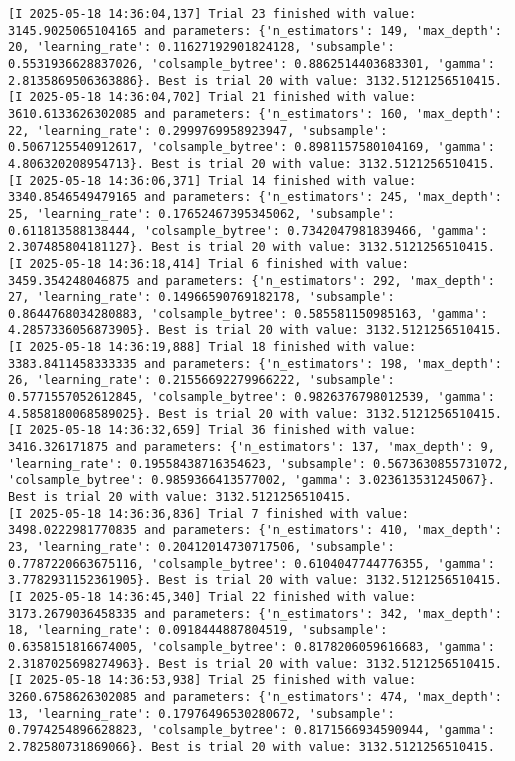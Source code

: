 \documentclass[
  letterpaper,
  DIV=11,
  numbers=noendperiod]{scrreprt}
\begin{document}
\begin{verbatim}
[I 2025-05-18 14:36:04,137] Trial 23 finished with value: 3145.9025065104165 and parameters: {'n_estimators': 149, 'max_depth': 20, 'learning_rate': 0.11627192901824128, 'subsample': 0.5531936628837026, 'colsample_bytree': 0.8862514403683301, 'gamma': 2.8135869506363886}. Best is trial 20 with value: 3132.5121256510415.
[I 2025-05-18 14:36:04,702] Trial 21 finished with value: 3610.6133626302085 and parameters: {'n_estimators': 160, 'max_depth': 22, 'learning_rate': 0.2999769958923947, 'subsample': 0.5067125540912617, 'colsample_bytree': 0.8981157580104169, 'gamma': 4.806320208954713}. Best is trial 20 with value: 3132.5121256510415.
[I 2025-05-18 14:36:06,371] Trial 14 finished with value: 3340.8546549479165 and parameters: {'n_estimators': 245, 'max_depth': 25, 'learning_rate': 0.17652467395345062, 'subsample': 0.611813588138444, 'colsample_bytree': 0.7342047981839466, 'gamma': 2.307485804181127}. Best is trial 20 with value: 3132.5121256510415.
[I 2025-05-18 14:36:18,414] Trial 6 finished with value: 3459.354248046875 and parameters: {'n_estimators': 292, 'max_depth': 27, 'learning_rate': 0.14966590769182178, 'subsample': 0.8644768034280883, 'colsample_bytree': 0.585581150985163, 'gamma': 4.2857336056873905}. Best is trial 20 with value: 3132.5121256510415.
[I 2025-05-18 14:36:19,888] Trial 18 finished with value: 3383.8411458333335 and parameters: {'n_estimators': 198, 'max_depth': 26, 'learning_rate': 0.21556692279966222, 'subsample': 0.5771557052612845, 'colsample_bytree': 0.9826376798012539, 'gamma': 4.5858180068589025}. Best is trial 20 with value: 3132.5121256510415.
[I 2025-05-18 14:36:32,659] Trial 36 finished with value: 3416.326171875 and parameters: {'n_estimators': 137, 'max_depth': 9, 'learning_rate': 0.19558438716354623, 'subsample': 0.5673630855731072, 'colsample_bytree': 0.9859366413577002, 'gamma': 3.023613531245067}. Best is trial 20 with value: 3132.5121256510415.
[I 2025-05-18 14:36:36,836] Trial 7 finished with value: 3498.0222981770835 and parameters: {'n_estimators': 410, 'max_depth': 23, 'learning_rate': 0.20412014730717506, 'subsample': 0.7787220663675116, 'colsample_bytree': 0.6104047744776355, 'gamma': 3.7782931152361905}. Best is trial 20 with value: 3132.5121256510415.
[I 2025-05-18 14:36:45,340] Trial 22 finished with value: 3173.2679036458335 and parameters: {'n_estimators': 342, 'max_depth': 18, 'learning_rate': 0.0918444887804519, 'subsample': 0.6358151816674005, 'colsample_bytree': 0.8178206059616683, 'gamma': 2.3187025698274963}. Best is trial 20 with value: 3132.5121256510415.
[I 2025-05-18 14:36:53,938] Trial 25 finished with value: 3260.6758626302085 and parameters: {'n_estimators': 474, 'max_depth': 13, 'learning_rate': 0.17976496530280672, 'subsample': 0.7974254896628823, 'colsample_bytree': 0.8171566934590944, 'gamma': 2.782580731869066}. Best is trial 20 with value: 3132.5121256510415.

\end{verbatim}
\end{document}

